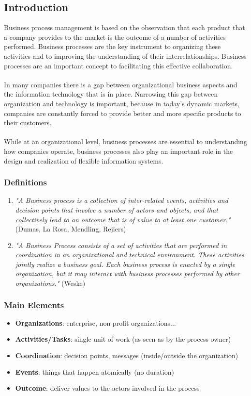 \documentclass[10pt,a4paper]{article}
\begin{document}
\subsection{Introduction}
Business process management is based on the observation that each product that a company provides to the market is the outcome of a number of activities performed. Business processes are the key instrument to organizing these activities and to improving the understanding of their interrelationships. Business processes are an important concept to facilitating this effective collaboration. \\ \\
In many companies there is a gap between organizational business aspects and the information technology that is in place. Narrowing this gap between organization and technology is important, because in today’s dynamic markets, companies are constantly forced to provide better and more specific products to their customers. \\ \\
While at an organizational level, business processes are essential to understanding how companies operate, business processes also play an important role in the design and realization of flexible information systems.
\subsubsection{Definitions}
\begin{enumerate}
	\item \textit{"A Business process is a collection of inter-related events, activities and decision points that involve a number of actors and objects, and that collectively lead to an outcome that is of value to at least one customer."} (Dumas, La Rosa, Mendling, Rejiers)
	\item \textit{"A Business Process consists of a set of activities that are performed in coordination in an organizational and technical environment. These activities jointly realize a business goal. Each business process is enacted by a single organization, but it may interact with business processes performed by other organizations."} (Weske)
\end{enumerate}
\subsubsection{Main Elements}
\begin{itemize}
	\item \textbf{Organizations}: enterprise, non profit organizations...
	\item \textbf{Activities/Tasks}: single unit of work (as seen as by the process owner)
	\item \textbf{Coordination}: decision points, messages (inside/outside the organization)
	\item \textbf{Events}: things that happen atomically (no duration)
	\item \textbf{Outcome}: deliver values to the actors involved in the process
\end{itemize}
\pagebreak
\end{document}
